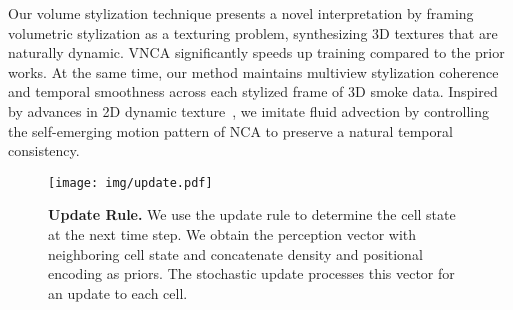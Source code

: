 Our volume stylization technique presents a novel interpretation by framing volumetric stylization as a texturing problem, synthesizing 3D textures that are naturally dynamic. 
VNCA significantly speeds up training compared to the prior works. At the same time, our method maintains multiview stylization coherence and temporal smoothness across each stylized frame of 3D smoke data. 
Inspired by advances in 2D dynamic texture~\cite{pajouheshgar2023dynca}, we imitate fluid advection by controlling the self-emerging motion pattern of NCA to preserve a natural temporal consistency. 





\begin{figure}
  \centering
  \texttt{[image: img/update.pdf]}
  \caption{\textbf{Update Rule.} We use the update rule to determine the cell state at the next time step. We obtain the perception vector with neighboring cell state and concatenate density and positional encoding as priors. The stochastic update processes this vector for an update to each cell.}
  \label{fig:update}
\end{figure}


